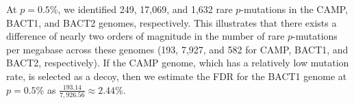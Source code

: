 At $p=0.5$\%, we identified 249, 17,069, and 1,632 rare $p$-mutations in the CAMP, BACT1, and BACT2 genomes, respectively. This illustrates that there exists a difference of nearly two orders of magnitude in the number of rare $p$-mutations per megabase across these genomes (193, 7,927, and 582 for CAMP, BACT1, and BACT2, respectively). If the CAMP genome, which has a relatively low mutation rate, is selected as a decoy, then we estimate the FDR for the BACT1 genome at $p=0.5\%$ as $\frac{193.14}{7,926.56} \approx 2.44\%$.\endinput